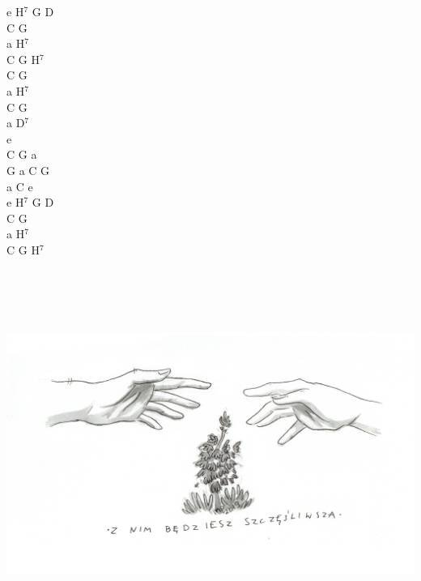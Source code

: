 \documentclass[a5paper, 10pt]{book}
\begin{document}
\begin{minipage}[t]{0.2\textwidth}
e H$^7$ G D\\
C G\\
a H$^7$\\
C G H$^7$\\

C G\\
a H$^7$\\
C G\\
a D$^7$\\
e\\
C G a\\
G a C G\\
a C e\\

e H$^7$ G D\\
C G\\
a H$^7$\\
C G H$^7$\\
\end{minipage}
~\\~\\~\\~\\
\includegraphics[width=\textwidth, center]{z_nim_bedziesz_szczesliwsza.png}\\

\newpage
\end{document}
